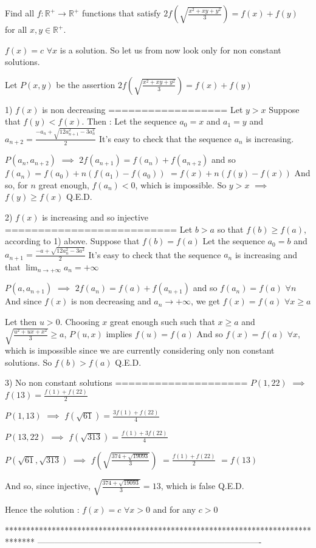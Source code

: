 \begin{solution}
	\begin{tcolorbox}Find all $f:\mathbb{R}^+ \rightarrow \mathbb{R}^+$  functions that satisfy $2f\left (\sqrt{\frac{x^2+xy+y^2}{3}}\right )=f(x)+f(y)$ for all $x,y\in \mathbb{R}^+$.\end{tcolorbox}
$f(x)=c$ $\forall x$ is a solution. So let us from now look only for non constant solutions.

Let $P(x,y)$ be the assertion $2f\left(\sqrt{\frac{x^2+xy+y^2}3}\right)=f(x)+f(y)$

1) $f(x)$ is non decreasing
==================
Let $y>x$
Suppose that $f(y)<f(x)$. Then :
Let the sequence $a_0=x$ and $a_1=y$ and $a_{n+2}=\frac{-a_n+\sqrt{12a_{n+1}^2-3a_n^2}}2$
It's easy to check that the sequence $a_n$ is increasing.

$P(a_n,a_{n+2})$ $\implies$ $2f(a_{n+1})=f(a_n)+f(a_{n+2})$ and so $f(a_n)=f(a_0)+n(f(a_1)-f(a_0))$ $=f(x)+n(f(y)-f(x))$
And so, for $n$ great enough, $f(a_n)<0$, which is impossible.
So $y>x$ $\implies$ $f(y)\ge f(x)$
Q.E.D.

2) $f(x)$ is increasing and so injective
==========================
Let $b>a$ so that $f(b)\ge f(a)$, according to 1) above.
Suppose that $f(b)=f(a)$
Let the sequence $a_0=b$ and $a_{n+1}=\frac{-a+\sqrt{12a_{n}^2-3a^2}}2$
It's easy to check that the sequence $a_n$ is increasing and that $\lim_{n\to+\infty}a_n=+\infty$

$P(a,a_{n+1})$ $\implies$ $2f(a_{n})=f(a)+f(a_{n+1})$ and so $f(a_n)=f(a)$ $\forall n$
And since $f(x)$ is non decreasing and $a_n\to+\infty$, we get $f(x)=f(a)$ $\forall x\ge a$

Let then $u>0$. Choosing $x$ great enough such such that $x\ge a$ and $\sqrt{\frac{u^2+ux+x^2}3}\ge a$, $P(u,x)$ implies $f(u)=f(a)$
And so $f(x)=f(a)$ $\forall x$, which is impossible since we are currently considering only non constant solutions.
So $f(b)>f(a)$
Q.E.D.

3) No non constant solutions
====================
$P(1,22)$ $\implies$ $f(13)=\frac{f(1)+f(22)}2$

$P(1,13)$ $\implies$ $f(\sqrt{61})=\frac{3f(1)+f(22)}4$

$P(13,22)$ $\implies$ $f(\sqrt{313})=\frac{f(1)+3f(22)}4$

$P(\sqrt{61},\sqrt{313})$ $\implies$ $f(\sqrt{\frac {374+\sqrt{19093}}3})$ $=\frac{f(1)+f(22)}2$ $=f(13)$

And so, since injective, $\sqrt{\frac {374+\sqrt{19093}}3}=13$, which is false
Q.E.D.


Hence the solution : $\boxed{f(x)=c}$ $\forall x>0$ and for any $c>0$
\end{solution}
*******************************************************************************
-------------------------------------------------------------------------------

